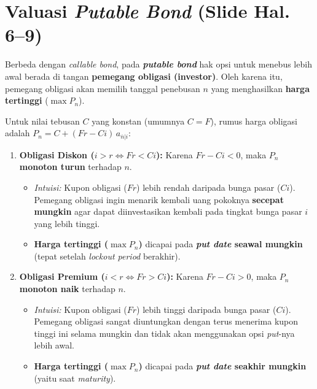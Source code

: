 \documentclass[11pt,a4paper]{article}
\begin{document}
\section{Valuasi \textit{Putable Bond} (Slide Hal. 6--9)}

Berbeda dengan \textit{callable bond}, pada \textbf{\textit{putable bond}} hak opsi untuk menebus lebih awal berada di tangan \textbf{pemegang obligasi (investor)}. Oleh karena itu, pemegang obligasi akan memilih tanggal penebusan $n$ yang menghasilkan \textbf{harga tertinggi} ($\max P_n$).

\begin{theorembox}
Untuk nilai tebusan $C$ yang konstan (umumnya $C = F$), rumus harga obligasi adalah $P_n = C + (Fr - Ci)\,a_{\overline{n}|i}$:
\begin{enumerate}[label=\textbf{\arabic*.}]
    \item \textbf{Obligasi Diskon ($i > r \iff Fr < Ci$):}
    Karena $Fr - Ci < 0$, maka $P_n$ \textbf{monoton turun} terhadap $n$.
    \begin{itemize}
        \item \textit{Intuisi:} Kupon obligasi ($Fr$) lebih rendah daripada bunga pasar ($Ci$). Pemegang obligasi ingin menarik kembali uang pokoknya \textbf{secepat mungkin} agar dapat diinvestasikan kembali pada tingkat bunga pasar $i$ yang lebih tinggi.
        \item \textbf{Harga tertinggi ($\max P_n$)} dicapai pada \textbf{\textit{put date} seawal mungkin} (tepat setelah \textit{lockout period} berakhir).
    \end{itemize}
    \item \textbf{Obligasi Premium ($i < r \iff Fr > Ci$):}
    Karena $Fr - Ci > 0$, maka $P_n$ \textbf{monoton naik} terhadap $n$.
    \begin{itemize}
        \item \textit{Intuisi:} Kupon obligasi ($Fr$) lebih tinggi daripada bunga pasar ($Ci$). Pemegang obligasi sangat diuntungkan dengan terus menerima kupon tinggi ini selama mungkin dan tidak akan menggunakan opsi \textit{put}-nya lebih awal.
        \item \textbf{Harga tertinggi ($\max P_n$)} dicapai pada \textbf{\textit{put date} seakhir mungkin} (yaitu saat \textit{maturity}).
    \end{itemize}
\end{enumerate}
\end{theorembox}
\end{document}
